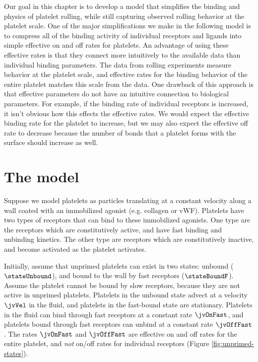 Our goal in this chapter is to develop a model that simplifies the
binding and physics of platelet rolling, while still capturing
observed rolling behavior at the platelet scale. One of the major
simplifications we make in the following model is to compress all of
the binding activity of individual receptors and ligands into simple
effective on and off rates for platelets. An advantage of using these
effective rates is that they connect more intuitively to the available
data than individual binding parameters. The data from rolling
experiments measure behavior at the platelet scale, and effective
rates for the binding behavior of the entire platelet matches this
scale from the data. One drawback of this approach is that effective
parameters do not have an intuitive connection to biological
parameters. For example, if the binding rate of individual receptors
is increased, it isn't obvious how this effects the effective
rates. We would expect the effective binding rate for the platelet to
increase, but we may also expect the effective off rate to
decrease because the number of bonds that a platelet forms with the
surface should increase as well.

\section{The model}
\label{sec:jv-model}

Suppose we model platelets as particles translating at a constant
velocity along a wall coated with an immobilized agonist (e.g. collagen
or vWF). Platelets have two types of receptors that can bind to these
immobilized agonists. One type are the receptors which are
constitutively active, and have fast binding and unbinding kinetics. The
other type are receptors which are constitutively inactive, and become
activated as the platelet activates. 

Initially, assume that unprimed platelets can exist in two states:
unbound ($\stateUnbound$), and bound to the wall by fast receptors
($\stateBoundF$). Assume the platelet cannot be bound by slow receptors,
because they are not active in unprimed platelets. Platelets in the
unbound state advect at a velocity $\jvVel$ in the fluid, and platelets
in the fast-bound state are stationary. Platelets in the fluid can bind
through fast receptors at a constant rate $\jvOnFast$, and platelets
bound through fast receptors can unbind at a constant rate
$\jvOffFast$. The rates $\jvOnFast$ and $\jvOffFast$ are effective on
and off rates for the entire platelet, and \emph{not} on/off rates for
individual receptors (Figure \ref{fig:unprimed-states}).

